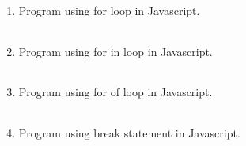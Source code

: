 \documentclass{exam}
\begin{document}
\begin{enumerate}
   \item  Program  using for loop in Javascript.

   \begin{myTableStyle}
   \begin{center} \begin{tabular}{ |m{14cm}| } \hline
              \\ \hline
    \end{tabular} \end{center}
\end{myTableStyle}
  \pagebreak

   \item  Program  using for in loop in Javascript.

   \begin{myTableStyle}
   \begin{center} \begin{tabular}{ |m{14cm}| } \hline
              \\ \hline
    \end{tabular} \end{center}
\end{myTableStyle}
  \pagebreak

   \item  Program  using for of loop in Javascript.

   \begin{myTableStyle}
   \begin{center} \begin{tabular}{ |m{14cm}| } \hline
              \\ \hline
    \end{tabular} \end{center}
\end{myTableStyle}
  \pagebreak

   \item  Program  using break statement in Javascript.

   \begin{myTableStyle}
   \begin{center} \begin{tabular}{ |m{14cm}| } \hline
              \\ \hline
    \end{tabular} \end{center}
\end{myTableStyle}
  \pagebreak



\end{enumerate}
\end{document}

